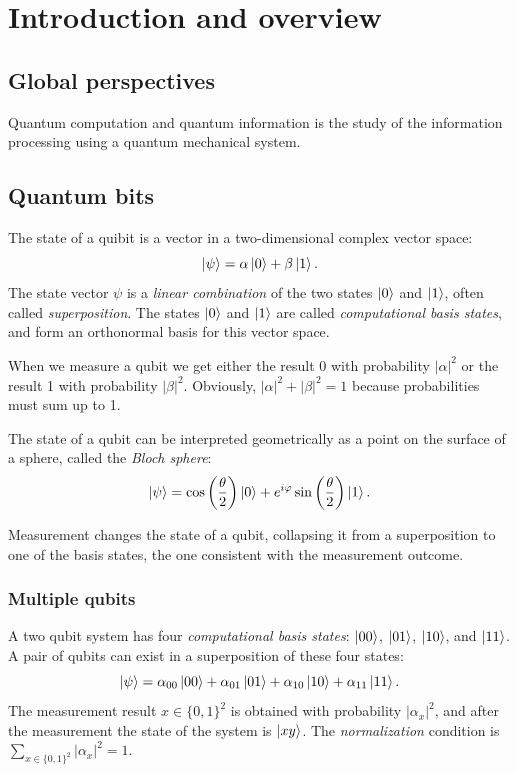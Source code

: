 \chapter{Introduction and overview}

\section{Global perspectives}

Quantum computation and quantum information is the study of the information processing using a quantum mechanical system.

\section{Quantum bits}

The state of a quibit is a vector in a two-dimensional complex vector space:
\[
    \ket{\psi} = \alpha \ket{0} + \beta \ket{1}.
\]
The state vector ${\psi}$ is a \emph{linear combination} of the two states $\ket{0}$ and $\ket{1}$,
often called \emph{superposition}.
The states $\ket{0}$ and $\ket{1}$ are called \emph{computational basis states},
and form an orthonormal basis for this vector space.

When we measure a qubit we get either the result \num{0} with probability $|\alpha|^2$ or the result \num{1} with probability $|\beta|^2$.
Obviously, $|\alpha|^2 + |\beta|^2 = 1$ because probabilities must sum up to \num{1}.

The state of a qubit can be interpreted geometrically as a point on the surface of a sphere, called the \emph{Bloch sphere}:
\[
    \ket{\psi} = \cos\left(\frac{\theta}{2}\right) \ket{0} + e^{i\varphi} \sin\left(\frac{\theta}{2}\right) \ket{1}.
\]

Measurement changes the state of a qubit, collapsing it from a superposition to one of the basis states,
the one consistent with the measurement outcome.

\subsection{Multiple qubits}

A two qubit system has four \emph{computational basis states}: $\ket{00}$, $\ket{01}$, $\ket{10}$, and $\ket{11}$.
A pair of qubits can exist in a superposition of these four states:
\[
    \ket{\psi} = \alpha_{00} \ket{00} + \alpha_{01} \ket{01} + \alpha_{10} \ket{10} + \alpha_{11} \ket{11}.
\]
The measurement result $x \in \{0, 1\}^2$ is obtained with probability $|\alpha_{x}|^2$,
and after the measurement the state of the system is $\ket{xy}$.
The \emph{normalization} condition is $\sum_{x \in \{0, 1\}^2} |\alpha_x|^2 = 1$.

